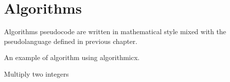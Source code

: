 \documentclass{book}
\begin{document}
\chapter{Algorithms}
Algorithms pseudocode are written in mathematical style mixed
with the pseudolanguage defined in previous chapter.

\begin{example}
    An example of algorithm using algorithmicx.
    \begin{algorithm}
        \caption{Multiply two integers}
        \begin{algorithmic}
            \Statex
                \EndWhile
            \EndFunction
        \end{algorithmic}
    \end{algorithm}
\end{example}
\end{document}
